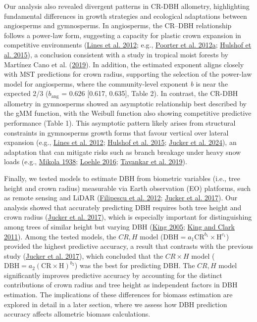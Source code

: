\documentclass[
  12pt,
  letterpaper,
  DIV=11,
  numbers=noendperiod]{scrartcl}
\begin{document}
Our analysis also revealed divergent patterns in CR-DBH allometry,
highlighting fundamental differences in growth strategies and ecological
adaptations between angiosperms and gymnosperms. In angiosperms, the
CR--DBH relationship follows a power-law form, suggesting a capacity for
plastic crown expansion in competitive environments
(\protect\hyperlink{ref-Lines2012}{Lines et al. 2012}; e.g.,
\protect\hyperlink{ref-Poorter2012a}{Poorter et al. 2012a};
\protect\hyperlink{ref-Hulshof2015}{Hulshof et al. 2015}), a conclusion
consistent with a study in tropical moist forests by Martínez Cano et
al. (\protect\hyperlink{ref-MartinezCano2019}{2019}). In addition, the
estimated exponent aligns closely with MST predictions for crown radius,
supporting the selection of the power-law model for angiosperms, where
the community-level exponent \emph{b} is near the expected 2/3
(\(b_{\text{ang}}\) = 0.626 {[}0.617, 0.635{]}, Table 2). In contrast,
the CR-DBH allometry in gymnosperms showed an asymptotic relationship
best described by the gMM function, with the Weibull function also
showing competitive predictive performance (Table 1). This asymptotic
pattern likely arises from structural constraints in gymnosperms growth
forms that favour vertical over lateral expansion (e.g.,
\protect\hyperlink{ref-Lines2012}{Lines et al. 2012};
\protect\hyperlink{ref-Hulshof2015}{Hulshof et al. 2015};
\protect\hyperlink{ref-Jucker2024}{Jucker et al. 2024}), an adaptation
that can mitigate risks such as branch breakage under heavy snow loads
(e.g., \protect\hyperlink{ref-Mikola1938}{Mikola 1938};
\protect\hyperlink{ref-Loehle2016}{Loehle 2016};
\protect\hyperlink{ref-Tavankar2019}{Tavankar et al. 2019}).

Finally, we tested models to estimate DBH from biometric variables
(i.e., tree height and crown radius) measurable via Earth observation
(EO) platforms, such as remote sensing and LiDAR
(\protect\hyperlink{ref-Filipescu2012}{Filipescu et al. 2012};
\protect\hyperlink{ref-Jucker2017}{Jucker et al. 2017}). Our analysis
showed that accurately predicting DBH requires both tree height and
crown radius (\protect\hyperlink{ref-Jucker2017}{Jucker et al. 2017}),
which is especially important for distinguishing among trees of similar
height but varying DBH (\protect\hyperlink{ref-King2005}{King 2005};
\protect\hyperlink{ref-King2011}{King and Clark 2011}). Among the tested
models, the \(CR,H\) model
(\(\mathrm{DBH} = a_1 \mathrm{CR}^{b_1} \times \mathrm{H}^{c_1}\))
provided the highest predictive accuracy, a result that contrasts with
the previous study (\protect\hyperlink{ref-Jucker2017}{Jucker et al.
2017}), which concluded that the \(CR \times H\) model
(\(\mathrm{DBH} = a_2(\mathrm{CR} \times \mathrm{H})^{b_2}\)) was the
best for predicting DBH. The \(CR,H\) model significantly improves
predictive accuracy by accounting for the distinct contributions of
crown radius and tree height as independent factors in DBH estimation.
The implications of these differences for biomass estimation are
explored in detail in a later section, where we assess how DBH
prediction accuracy affects allometric biomass calculations.
\end{document}
